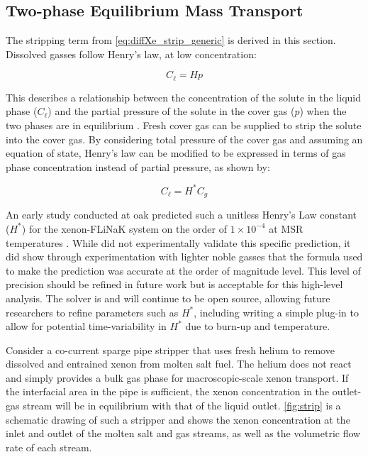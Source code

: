 \subsection{Two-phase Equilibrium Mass Transport}\label{sec-masstransport}
The stripping term from \ref{eq:diffXe_strip_generic} is derived in this section. Dissolved gasses follow Henry's law, at low concentration: 

\begin{equation}\label{eq:henry}
    C_{\ell} = Hp
\end{equation}

 This describes a relationship between the concentration of the solute in the liquid phase ($C_{\ell}$) and the partial pressure of the solute in the cover gas ($p$) when the two phases are in equilibrium \cite[Ch. 10]{Geankoplis}. Fresh cover gas can be supplied to strip the solute into the cover gas. By considering total pressure of the cover gas and assuming an equation of state, Henry's law can be modified to be expressed in terms of gas phase concentration instead of partial pressure, as shown by: 

\begin{equation}\label{eq:henry-modified}
    C_{\ell} = H^{*}C_g
\end{equation}

An early study conducted at \acs{oak} predicted such a unitless Henry's Law constant ($H^*$) for the xenon-FLiNaK system on the order of $1 \times 10^{-4}$ at MSR temperatures \cite{ORNL-solubility}. While \cite{ORNL-solubility} did not experimentally validate this specific prediction, it did show through experimentation with lighter noble gasses that the formula used to make the prediction was accurate at the order of magnitude level. This level of precision should be refined in future work but is acceptable for this high-level analysis. The solver is and will continue to be open source, allowing future researchers to refine  parameters such as $H^*$, including writing a simple plug-in to allow for potential time-variability in $H^*$ due to burn-up and temperature.

Consider a co-current sparge pipe stripper that uses fresh helium to remove dissolved and entrained xenon from molten salt fuel. The helium does not react and simply provides a bulk gas phase for macroscopic-scale xenon transport. If the interfacial area in the pipe is sufficient, the xenon concentration in the outlet-gas stream will be in equilibrium with that of the liquid outlet. \cref{fig:strip} is a schematic drawing of such a stripper and shows the xenon concentration at the inlet and outlet of the molten salt and gas streams, as well as the volumetric flow rate of each stream. 

